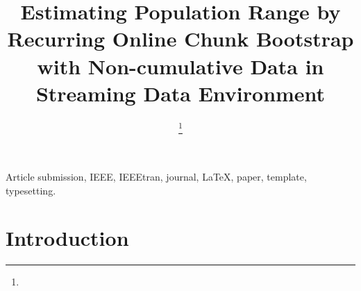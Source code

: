 \documentclass[lettersize,journal]{IEEEtran}
\begin{document}
\title{Estimating Population Range by Recurring Online Chunk Bootstrap with Non-cumulative
Data in Streaming Data Environment}

\author{
\thanks{}}




\maketitle

\begin{abstract}

\end{abstract}

\begin{IEEEkeywords}
Article submission, IEEE, IEEEtran, journal, \LaTeX, paper, template, typesetting.
\end{IEEEkeywords}

\section{Introduction}
\IEEEPARstart{}{} 
\end{document}

